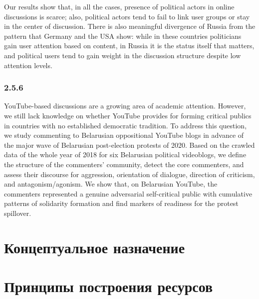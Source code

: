 Our results show that, in all the cases, presence of political actors in online discussions is scarce; also, political actors tend to fail to link user groups or stay in the center of discussion. There is also meaningful divergence of Russia from the pattern that Germany and the USA show: while in these countries politicians gain user attention based on content, in Russia it is the status itself that matters, and political users tend to gain weight in the discussion structure despite low attention levels.

\subsubsection{2.5.6}

YouTube-based discussions are a growing area of academic attention. However, we still lack knowledge on whether YouTube provides for forming critical publics in countries with no established democratic tradition. To address this question, we study commenting to Belarusian oppositional YouTube blogs in advance of the major wave of Belarusian post-election protests of 2020. Based on the crawled data of the whole year of 2018 for six Belarusian political videoblogs, we define the structure of the commenters’ community, detect the core commenters, and assess their discourse for aggression, orientation of dialogue, direction of criticism, and antagonism/agonism. We show that, on Belarusian YouTube, the commenters represented a genuine adversarial self-critical public with cumulative patterns of solidarity formation and find markers of readiness for the protest spillover.

\section{Концептуальное назначение}\label{sec:ch2/sec1}

%

\section{Принципы построения ресурсов}\label{sec:ch2/sect2}


